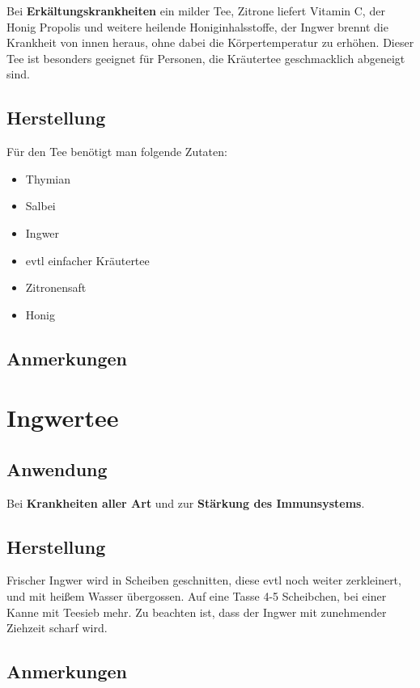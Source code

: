 Bei \textbf{Erkältungskrankheiten} ein milder Tee, Zitrone liefert Vitamin C, der Honig Propolis und weitere heilende Honiginhalsstoffe, der Ingwer brennt die Krankheit von innen heraus, ohne dabei die Körpertemperatur zu erhöhen. Dieser Tee ist besonders geeignet für Personen, die Kräutertee geschmacklich abgeneigt sind.

\subsection{Herstellung}

Für den Tee benötigt man folgende Zutaten:

\begin{itemize}
	\item Thymian
	\item Salbei
	\item Ingwer
	\item evtl einfacher Kräutertee
	\item Zitronensaft
	\item Honig
\end{itemize}


\subsection{Anmerkungen}



\section{Ingwertee}

\subsection{Anwendung}

Bei \textbf{Krankheiten aller Art} und zur \textbf{Stärkung des Immunsystems}.

\subsection{Herstellung}

Frischer Ingwer wird in Scheiben geschnitten, diese evtl noch weiter zerkleinert, und mit heißem Wasser übergossen. Auf eine Tasse 4-5 Scheibchen, bei einer Kanne mit Teesieb mehr. Zu beachten ist, dass der Ingwer mit zunehmender Ziehzeit scharf wird.

\subsection{Anmerkungen}

